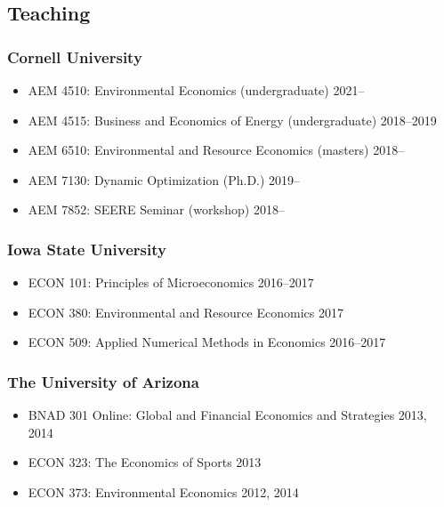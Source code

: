 \documentclass[11pt]{res} %
\begin{document}
\begin{resume}
\vspace{-.2in}

\subsection{Teaching}\vspace{-.2in}
\subsubsection{Cornell University}
\begin{itemize} \itemsep -1pt
	\item[] AEM 4510: Environmental Economics (undergraduate) \hfill 2021--
	\item[] AEM 4515: Business and Economics of Energy (undergraduate) \hfill 2018--2019
	\item[] AEM 6510: Environmental and Resource Economics (masters) \hfill 2018--
	\item[] AEM 7130: Dynamic Optimization (Ph.D.) \hfill 2019--
	\item[] AEM 7852: SEERE Seminar (workshop) \hfill 2018--
\end{itemize}\vspace{-.3in}
\subsubsection{Iowa State University}
\begin{itemize} \itemsep -1pt
	\item[] ECON 101: Principles of Microeconomics \hfill 2016--2017
	\item[] ECON 380: Environmental and Resource Economics \hfill 2017
	\item[] ECON 509: Applied Numerical Methods in Economics \hfill 2016--2017
\end{itemize}\vspace{-.3in}
\subsubsection{The University of Arizona}
\begin{itemize} \itemsep -1pt %
	\item[] BNAD 301 Online: Global and Financial Economics and Strategies \hfill 2013, 2014
	\item[] ECON 323: The Economics of Sports \hfill 2013
	\item[] ECON 373: Environmental Economics \hfill 2012, 2014
\end{itemize}


\end{resume}
\end{document}

